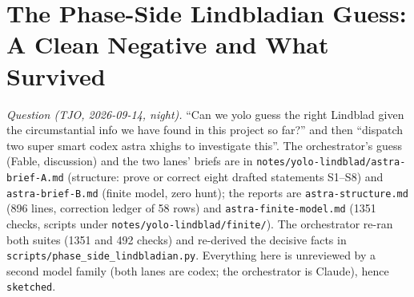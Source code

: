 
\section{The Phase-Side Lindbladian Guess: A Clean Negative and What Survived}
\label{sec:phase-side-lindbladian}

\emph{Question (TJO, 2026-09-14, night).} ``Can we yolo guess the right Lindblad given the
circumstantial info we have found in this project so far?'' and then ``dispatch two super smart
codex astra xhighs to investigate this''. The orchestrator's guess (Fable, discussion) and the two
lanes' briefs are in \texttt{notes/yolo-lindblad/astra-brief-A.md} (structure: prove or correct
eight drafted statements S1--S8) and \texttt{astra-brief-B.md} (finite model, zero hunt); the reports
are \texttt{astra-structure.md} (896 lines, correction ledger of 58 rows) and
\texttt{astra-finite-model.md} (1351 checks, scripts under \texttt{notes/yolo-lindblad/finite/}).
The orchestrator re-ran both suites (1351 and 492 checks) and re-derived the decisive facts in
\texttt{scripts/phase\_side\_lindbladian.py}. Everything here is unreviewed by a second model family
(both lanes are codex; the orchestrator is Claude), hence \texttt{sketched}.

